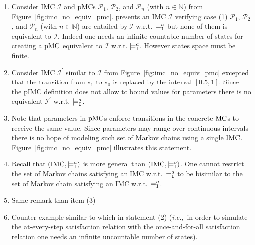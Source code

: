 \documentclass{llncs}
\newcommand{\mc}{\textnormal{MC}}
\newcommand{\imc}{\textnormal{IMC}}
\newcommand{\pimc}{\textnormal{pIMC}}
\newcommand{\pmc}{\textnormal{pMC}}
\newcommand{\satisfactionImcOnce}{\ensuremath{\models^{o}_{\tt{I}}}}
\newcommand{\satisfactionImc}{\ensuremath{\models^{a}_{\tt{I}}}}
\newcommand{\ie} {{\em i.e.},\ }
\newcommand{\Nset}             {\ensuremath{\mathbb{N}}}
\begin{document}
    \begin{enumerate}
    	\item Consider {\imc} $\mathcal{I}$ and {\pmc}s $\mathcal{P}_1$,
        	$\mathcal{P}_2$, and $\mathcal{P}_n$ (with $n \in \Nset$) from 	
            Figure~\ref{fig:imc_no_equiv_pmc}. 
        	presents an {\imc} $\mathcal{I}$ verifying case (1)
			$\mathcal{P}_1$, $\mathcal{P}_2$, and $\mathcal{P}_n$ (with $n \in \Nset$) 
            are entailed by $\mathcal{I}$ w.r.t. $\satisfactionImc$
            but none of them is equivalent to $\mathcal{I}$. 
            Indeed one needs an infinite countable number of states 
			for creating a ${\pmc}$ equivalent to $\mathcal{I}$ w.r.t. $\satisfactionImc$.
            However states space must be finite.
            
		\item Consider {\imc} $\mathcal{I^\prime}$ similar to $\mathcal{I}$ 
        	from Figure~\ref{fig:imc_no_equiv_pmc} excepted that 
        	the transition from $s_1$ to $s_0$ is replaced by the interval $[0.5, 1]$.
            Since the {\pimc} definition does not allow to bound values for parameters
            there is no equivalent $\mathcal{I^\prime}$ w.r.t. $\satisfactionImc$.
            
		\item Note that parameters in ${\pmc}$s enforce transitions 
        	in the concrete ${\mc}$s to receive the same value.
			Since parameters may range over continuous intervals there is no hope of modeling
			such set of Markov chains using a single $\imc$.
            Figure~\ref{fig:imc_no_equiv_pmc} illustrates this statement.
            
		\item Recall that $(\imc, \satisfactionImc)$ is more general than $(\imc, \satisfactionImcOnce)$. One cannot restrict the set of Markov chains satisfying an {\imc} w.r.t. $\satisfactionImc$ to be bisimilar to the set of Markov chain satisfying an {\imc} w.r.t. $\satisfactionImcOnce$.
            
        \item Same remark than item (3)
            
		\item Counter-example similar to which in statement (2) 
        (\ie in order to simulate the at-every-step satisfaction relation with the once-and-for-all satisfaction relation one needs an infinite uncountable number of states).
    \end{enumerate}
\end{document}
